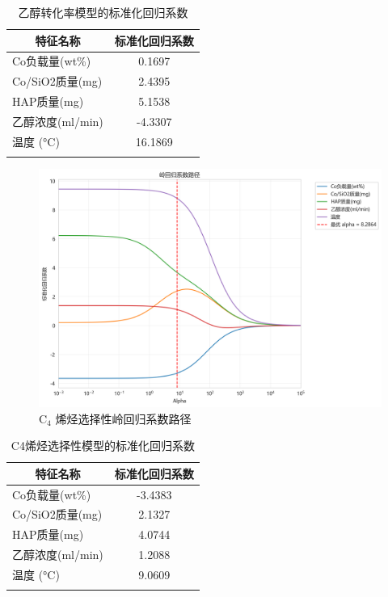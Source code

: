 \begin{table}[!htbp]
	\caption{乙醇转化率模型的标准化回归系数}
	\centering
	\begin{tabular}{l c}
		\hline
		\multicolumn{1}{c}{\textbf{特征名称}} & \textbf{标准化回归系数} \\
		\hline
		Co负载量(wt\%)      & 0.1697 \\
		Co/SiO2质量(mg)     & 2.4395 \\
		HAP质量(mg)         & 5.1538 \\
		乙醇浓度(ml/min)    & -4.3307 \\
		温度 (°C)                & 16.1869 \\
		\hline
		\label{tab:ridge_coefficients}
	\end{tabular}
\end{table}

\begin{figure}[h]%
	\centering%
	\includegraphics [scale=0.6]{图/ling-xuanzexing.png}
	\caption{ \( \text{C}_4 \) 烯烃选择性岭回归系数路径} 
	\label{fig:1}
\end{figure}

\begin{table}[!htbp]
	\caption{C4烯烃选择性模型的标准化回归系数}
	\centering
	\begin{tabular}{l c}
		\hline
		\multicolumn{1}{c}{\textbf{特征名称}} & \textbf{标准化回归系数} \\
		\hline
		Co负载量(wt\%)      & -3.4383 \\
		Co/SiO2质量(mg)     & 2.1327 \\
		HAP质量(mg)         & 4.0744 \\
		乙醇浓度(ml/min)    & 1.2088 \\
		温度 (°C)               & 9.0609 \\
		\hline
		\label{tab:ridge_selectivity}
	\end{tabular}
\end{table}



